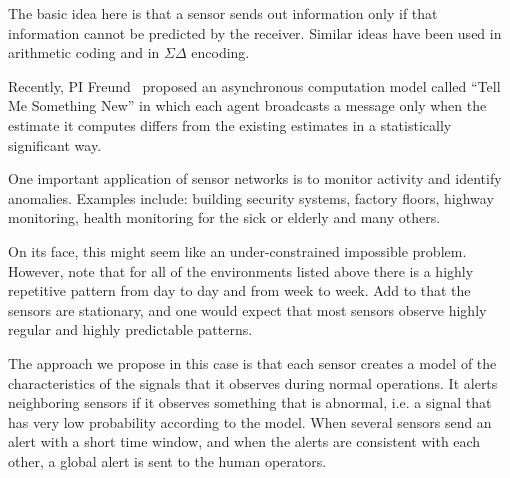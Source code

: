 The basic idea here is that a sensor sends out information only if
that information cannot be predicted by the receiver. Similar ideas
have been used in arithmetic coding and  in
$\Sigma\Delta$ encoding.

Recently, PI Freund~\cite{TMSN} proposed an asynchronous computation
model called ``Tell Me Something New'' in which each agent broadcasts
a message only when the estimate it computes differs from the existing
estimates in a statistically significant way.

 One important application of sensor networks is to monitor activity
 and identify anomalies. Examples include: building security systems,
 factory floors, highway monitoring, health monitoring for the sick or
 elderly and many others.

 On its face, this might seem like an under-constrained impossible
 problem. However, note that for all of the environments listed above
 there is a highly repetitive pattern from day to day and from week to
 week. Add to that the sensors are stationary, and one would expect
 that most sensors observe highly regular and highly predictable
 patterns.
 
 The approach we propose in this case is that each sensor creates a
 model of the characteristics of the signals that it observes during
 normal operations. It alerts neighboring sensors if it observes
 something that is abnormal, i.e. a signal that has very low
 probability according to the model. When several sensors send an
 alert with a short time window, and when the alerts are consistent
 with each other, a global alert is sent to the human operators.

